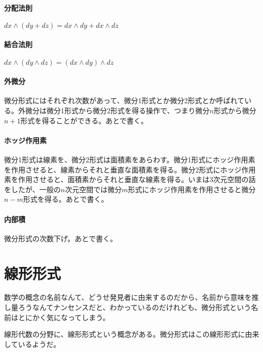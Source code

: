\paragraph{分配法則}

$ d x \wedge ( d y + d z ) = d x \wedge d y + d x \wedge d z $

\paragraph{結合法則}

$ d x \wedge (d y \wedge d z) = (d x \wedge d y) \wedge d z $

\paragraph{外微分}

微分形式にはそれぞれ次数があって、微分1形式とか微分2形式とか呼ばれている。外微分は微分1形式から微分2形式を得る操作で、つまり微分$n$形式から微分$n+1$形式を得ることができる。あとで書く。

\paragraph{ホッジ作用素}

微分1形式は線素を、微分2形式は面積素をあらわす。微分1形式にホッジ作用素を作用させると、線素からそれと垂直な面積素を得る。微分2形式にホッジ作用素を作用させると、面積素からそれと垂直な線素を得る。いまは3次元空間の話をしたが、一般の$n$次元空間では微分$m$形式にホッジ作用素を作用させると微分$n-m$形式を得る。あとで書く。

\paragraph{内部積}

微分形式の次数下げ。あとで書く。


\section{線形形式}

数学の概念の名前なんて、どうせ発見者に由来するのだから、名前から意味を推し量ろうなんてナンセンスだと、わかっているのだけれども、微分形式という名前はとにかく気になってしまう。

線形代数の分野に、線形形式という概念がある。微分形式はこの線形形式に由来しているようだ。

\newpage

\newpage

